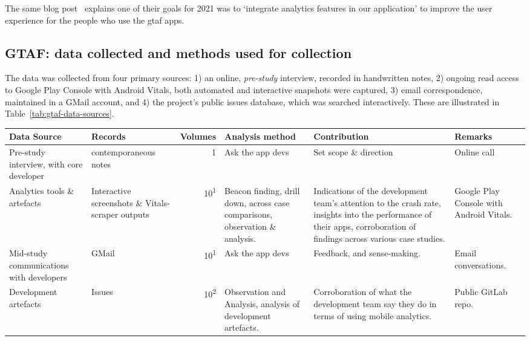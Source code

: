 The same blog post~ explains one of their goals for 2021 was to `integrate analytics features in our application' to improve the user experience for the people who use the \acrshort{gtaf} apps.

\subsection{GTAF: data collected and methods used for collection}
The data was collected from four primary sources: 1) an online, \textit{pre-study} interview, recorded in handwritten notes, 2) ongoing read access to Google Play Console with Android Vitals, both automated and interactive snapshots were captured, 3) email correspondence, maintained in a GMail account, and 4) the project's public issues database, which was searched interactively. These are illustrated in Table~\ref{tab:gtaf-data-sources}.


\begin{table*}
    \centering
    \footnotesize
    \tabcolsep=0.12cm
    \begin{tabular}{p{2.4cm}p{2.4cm}r>{\raggedright}p{2.4cm}>{\raggedright}p{3cm}>{\raggedright\arraybackslash}p{2.5cm}}
        Data Source & Records & Volumes & Analysis method &Contribution & Remarks \\
        \toprule
         Pre-study interview, with core developer & contemporaneous notes\footnotemark & 1 & Ask the app devs & Set scope \& direction & Online call \\
         Analytics tools \& artefacts &Interactive screenshots \& Vitals-scraper outputs &10\textsuperscript{1} & Beacon finding, drill down, across case comparisons, observation \& analysis. & Indications of the development team's attention to the crash rate, insights into the performance of their apps, corroboration of findings across various case studies. & Google Play Console with Android Vitals. \\         
         Mid-study communications with developers & GMail & 10\textsuperscript{1} & Ask the app devs & Feedback, and sense-making.  & Email conversations. \\
         Development artefacts  & Issues & 10\textsuperscript{2} & Observation and Analysis, analysis of development artefacts. & Corroboration of what the development team say they do in terms of using mobile analytics. & Public GitLab repo. \\
         \bottomrule
    \end{tabular}
    \caption{GTAF: data sources}
    \label{tab:gtaf-data-sources}
\end{table*}



